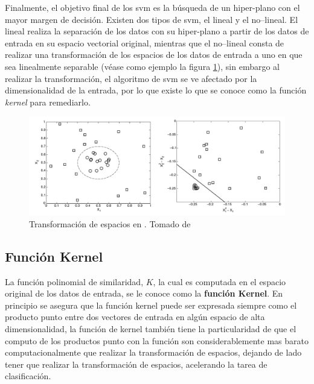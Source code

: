 Finalmente, el objetivo final de los \gls{svm} es la búsqueda de un hiper-plano con el mayor margen de decisión. Existen dos tipos de \gls{svm}, el lineal y el no--lineal. El lineal realiza la separación de los datos con su hiper-plano a partir de los datos de entrada en su espacio vectorial original, mientras que el no--lineal consta de realizar una transformación de los espacios de los datos de entrada a uno en que sea linealmente separable (véase como ejemplo la figura \ref{fig:svm-nonlinear-transforms}), sin embargo al realizar la transformación, el algoritmo de \gls{svm} se ve afectado por la dimensionalidad de la entrada, por lo que existe lo que se conoce como la función \emph{kernel} para remediarlo.

\begin{figure}[th]
\centering
\includegraphics[scale=0.25]{Figures/svm-nonlinear-transform.png}
\decoRule
\caption[Transformación de espacios en ]{Transformación de espacios en . Tomado de \cite{tan2005introduction}}
\label{fig:svm-nonlinear-transforms}
\end{figure}

\subsection{Función Kernel}
La función polinomial de similaridad, $K$, la cual es computada en el espacio original de los datos de entrada, se le conoce como la \textbf{función Kernel}. En principio se asegura que la función kernel puede ser expresada siempre como el producto punto entre dos vectores de entrada en algún espacio de alta dimensionalidad, la función de kernel también tiene la particularidad de que el computo de los productos punto con la función son considerablemente mas barato computacionalmente que realizar la transformación de espacios, dejando de lado tener que realizar la transformación de espacios, acelerando la tarea de clasificación.


